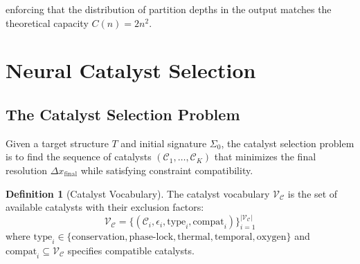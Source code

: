 \documentclass[11pt,twocolumn,a4paper]{article}
\theoremstyle{definition}
\newtheorem{definition}[theorem]{Definition}
\theoremstyle{remark}
\newcommand{\Sig}{\Sigma}
\newcommand{\catalyst}{\mathcal{C}}
\newcommand{\vocab}{\mathcal{V}}
\begin{document}
enforcing that the distribution of partition depths in the output matches the theoretical capacity $C(n) = 2n^2$.

\section{Neural Catalyst Selection}
\label{sec:catalyst}

\subsection{The Catalyst Selection Problem}

Given a target structure $T$ and initial signature $\Sig_0$, the catalyst selection problem is to find the sequence of catalysts $(\catalyst_1, \ldots, \catalyst_K)$ that minimizes the final resolution $\Delta x_{\mathrm{final}}$ while satisfying constraint compatibility.

\begin{definition}[Catalyst Vocabulary]
\label{def:catalyst_vocab}
The catalyst vocabulary $\vocab_\catalyst$ is the set of available catalysts with their exclusion factors:
\begin{equation}
\vocab_\catalyst = \{(\catalyst_i, \epsilon_i, \text{type}_i, \text{compat}_i)\}_{i=1}^{|\vocab_\catalyst|}
\end{equation}
where $\text{type}_i \in \{\text{conservation}, \text{phase-lock}, \text{thermal}, \text{temporal}, \text{oxygen}\}$ and $\text{compat}_i \subseteq \vocab_\catalyst$ specifies compatible catalysts.
\end{definition}
\end{document}
